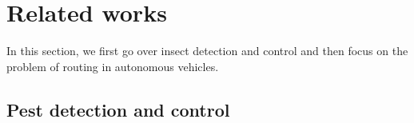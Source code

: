 \section{Related works}
In this section, we first go over insect detection and control and then focus on the problem of routing in autonomous vehicles.

\subsection{Pest detection and control}


